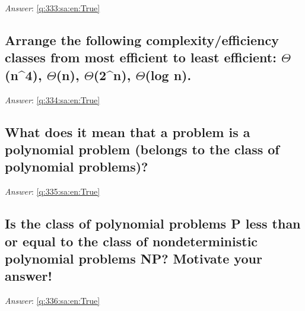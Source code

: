 \documentclass[a4paper,11pt,oneside]{article}
\begin{document}
\begin{sloppypar}
\vspace{1cm}

\textit{Answer}: \autoref{q:333:sa:en:True}



\subsection{Arrange the following complexity/efficiency classes from most efficient to least efficient: \ensuremath{\Theta}(n^4), \ensuremath{\Theta}(n), \ensuremath{\Theta}(2^n), \ensuremath{\Theta}(log n).}

\label{q:334:sa:en:False}

\vspace{2cm}

\noindent\makebox[\textwidth]{\hrulefill}

\vspace{1cm}

\textit{Answer}: \autoref{q:334:sa:en:True}



\subsection{What does it mean that a problem is a polynomial problem (belongs to the class of polynomial problems)?}

\label{q:335:sa:en:False}

\vspace{2cm}

\noindent\makebox[\textwidth]{\hrulefill}

\vspace{1cm}

\textit{Answer}: \autoref{q:335:sa:en:True}



\subsection{Is the class of polynomial problems P less than or equal to the class of nondeterministic polynomial problems NP? Motivate your answer!}

\label{q:336:sa:en:False}

\vspace{2cm}

\noindent\makebox[\textwidth]{\hrulefill}

\vspace{1cm}

\textit{Answer}: \autoref{q:336:sa:en:True}




\end{sloppypar}
\end{document}
